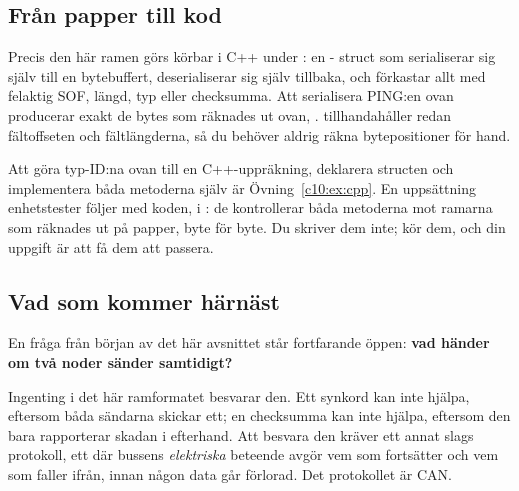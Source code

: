 \subsection*{Från papper till kod}
Precis den här ramen görs körbar i C++ under : en -\!
struct som serialiserar sig själv till en bytebuffert, deserialiserar sig själv tillbaka, och
förkastar allt med felaktig SOF, längd, typ eller checksumma. Att serialisera PING:en ovan
producerar exakt de bytes som räknades ut ovan, .
 tillhandahåller redan fältoffseten och fältlängderna, så du behöver aldrig räkna
bytepositioner för hand.

Att göra typ-ID:na ovan till en C++-uppräkning, deklarera structen och implementera båda metoderna
själv är Övning~\ref{c10:ex:cpp}. En uppsättning enhetstester följer med koden, i
: de kontrollerar båda metoderna mot ramarna som räknades ut på papper,
byte för byte. Du skriver dem inte;  kör dem, och din uppgift är att få dem att passera.

\subsection*{Vad som kommer härnäst}
En fråga från början av det här avsnittet står fortfarande öppen: \textbf{vad händer om två noder
sänder samtidigt?}

Ingenting i det här ramformatet besvarar den. Ett synkord kan inte hjälpa, eftersom båda sändarna
skickar ett; en checksumma kan inte hjälpa, eftersom den bara rapporterar skadan i efterhand. Att
besvara den kräver ett annat slags protokoll, ett där bussens \emph{elektriska} beteende avgör vem
som fortsätter och vem som faller ifrån, innan någon data går förlorad. Det protokollet är CAN.
